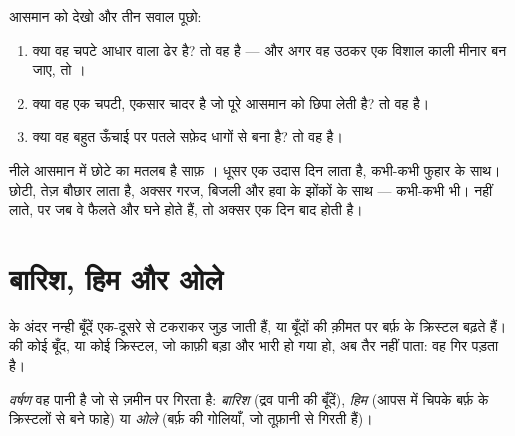 \begin{method}[बादल का नाम बताना]\label{met:g4:clouds-rain-snow:naming}
आसमान को देखो और तीन सवाल पूछो:
\begin{enumerate}
  \item क्या वह चपटे आधार वाला ढेर है? तो वह  है --- और अगर वह
        उठकर एक विशाल काली मीनार बन जाए, तो ।
  \item क्या वह एक चपटी, एकसार चादर है जो पूरे आसमान को छिपा लेती है? तो वह
         है।
  \item क्या वह बहुत ऊँचाई पर पतले सफ़ेद धागों से बना है? तो वह  है।
\end{enumerate}
\end{method}

\begin{remark}[बादल मौसम बताते हैं]\label{rem:g4:clouds-rain-snow:tell}
नीले आसमान में छोटे  का मतलब है साफ़ । धूसर  एक उदास
दिन लाता है, कभी-कभी फुहार के साथ।  छोटी, तेज़ बौछार लाता है,
अक्सर गरज, बिजली और हवा के झोंकों के साथ --- कभी-कभी  भी। 
 नहीं लाते, पर जब वे फैलते और घने होते हैं, तो अक्सर एक दिन बाद 
होती है।
\end{remark}

\section{बारिश, हिम और ओले}

 के अंदर नन्ही बूँदें एक-दूसरे से टकराकर जुड़ जाती हैं, या बूँदों की क़ीमत
पर बर्फ़ के क्रिस्टल बढ़ते हैं।  की कोई बूँद, या कोई क्रिस्टल, जो काफ़ी बड़ा
और भारी हो गया हो, अब तैर नहीं पाता: वह गिर पड़ता है।

\begin{definition}[वर्षण]\label{def:g4:clouds-rain-snow:precipitation}
\emph{वर्षण} वह पानी है जो  से ज़मीन पर गिरता है:
\emph{बारिश} (द्रव पानी की बूँदें), \emph{हिम}
(आपस में चिपके बर्फ़ के क्रिस्टलों से बने फाहे) या \emph{ओले}
(बर्फ़ की गोलियाँ, जो तूफ़ानी  से गिरती हैं)।
\end{definition}

